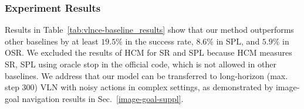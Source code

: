 \documentclass[10pt,twocolumn,letterpaper]{article}
\begin{document}
\subsubsection{Experiment Results}
Results in Table~\ref{tab:vlnce-baseline_results} show that our method outperforms other baselines by at least $19.5\%$ in the success rate, $8.6\%$ in SPL, and $5.9\%$ in OSR. We excluded the results of HCM for SR and SPL because HCM measures SR, SPL using oracle stop in the official code, which is not allowed in other baselines. We address that our model can be transferred to long-horizon (max. step 300) VLN with noisy actions in complex settings, as demonstrated by image-goal navigation results in Sec.~\ref{image-goal-suppl}.
\end{document}
